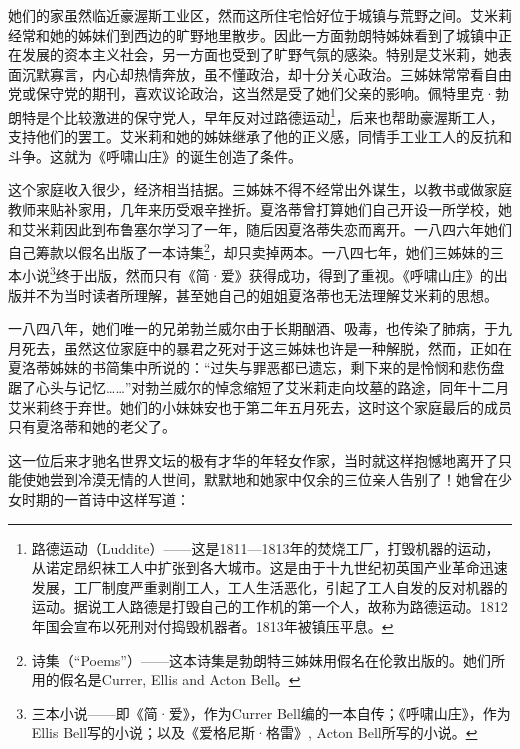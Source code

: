 \par 她们的家虽然临近豪渥斯工业区，然而这所住宅恰好位于城镇与荒野之间。艾米莉经常和她的姊妹们到西边的旷野地里散步。因此一方面勃朗特姊妹看到了城镇中正在发展的资本主义社会，另一方面也受到了旷野气氛的感染。特别是艾米莉，她表面沉默寡言，内心却热情奔放，虽不懂政治，却十分关心政治。三姊妹常常看自由党或保守党的期刊，喜欢议论政治，这当然是受了她们父亲的影响。佩特里克·勃朗特是个比较激进的保守党人，早年反对过路德运动\footnote{路德运动（Luddite）——这是1811—1813年的焚烧工厂，打毁机器的运动，从诺定昂织袜工人中扩张到各大城市。这是由于十九世纪初英国产业革命迅速发展，工厂制度严重剥削工人，工人生活恶化，引起了工人自发的反对机器的运动。据说工人路德是打毁自己的工作机的第一个人，故称为路德运动。1812年国会宣布以死刑对付捣毁机器者。1813年被镇压平息。}，后来也帮助豪渥斯工人，支持他们的罢工。艾米莉和她的姊妹继承了他的正义感，同情手工业工人的反抗和斗争。这就为《呼啸山庄》的诞生创造了条件。
\par 这个家庭收入很少，经济相当拮据。三姊妹不得不经常出外谋生，以教书或做家庭教师来贴补家用，几年来历受艰辛挫折。夏洛蒂曾打算她们自己开设一所学校，她和艾米莉因此到布鲁塞尔学习了一年，随后因夏洛蒂失恋而离开。一八四六年她们自己筹款以假名出版了一本诗集\footnote{诗集（“Poems”）——这本诗集是勃朗特三姊妹用假名在伦敦出版的。她们所用的假名是Currer, Ellis and Acton Bell。}，却只卖掉两本。一八四七年，她们三姊妹的三本小说\footnote{三本小说——即《简·爱》，作为Currer Bell编的一本自传；《呼啸山庄》，作为Ellis Bell写的小说；以及《爱格尼斯·格雷》, Acton Bell所写的小说。}终于出版，然而只有《简·爱》获得成功，得到了重视。《呼啸山庄》的出版并不为当时读者所理解，甚至她自己的姐姐夏洛蒂也无法理解艾米莉的思想。
\par 一八四八年，她们唯一的兄弟勃兰威尔由于长期酗酒、吸毒，也传染了肺病，于九月死去，虽然这位家庭中的暴君之死对于这三姊妹也许是一种解脱，然而，正如在夏洛蒂姊妹的书简集中所说的：“过失与罪恶都已遗忘，剩下来的是怜悯和悲伤盘踞了心头与记忆……”对勃兰威尔的悼念缩短了艾米莉走向坟墓的路途，同年十二月艾米莉终于弃世。她们的小妹妹安也于第二年五月死去，这时这个家庭最后的成员只有夏洛蒂和她的老父了。
\par 这一位后来才驰名世界文坛的极有才华的年轻女作家，当时就这样抱憾地离开了只能使她尝到冷漠无情的人世间，默默地和她家中仅余的三位亲人告别了！她曾在少女时期的一首诗中这样写道：

